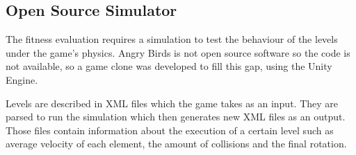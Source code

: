 \subsection{Open Source Simulator}

The fitness evaluation requires a simulation to test the behaviour of the levels under the game's physics. Angry Birds is not open source software so the code is not available, so a game clone was developed to fill this gap, using the Unity Engine. 

Levels are described in XML files which the game takes as an input. They are parsed to run the simulation which then generates new XML files as an output. Those files contain information about the execution of a certain level such as average velocity of each element, the amount of collisions and the final rotation. 
